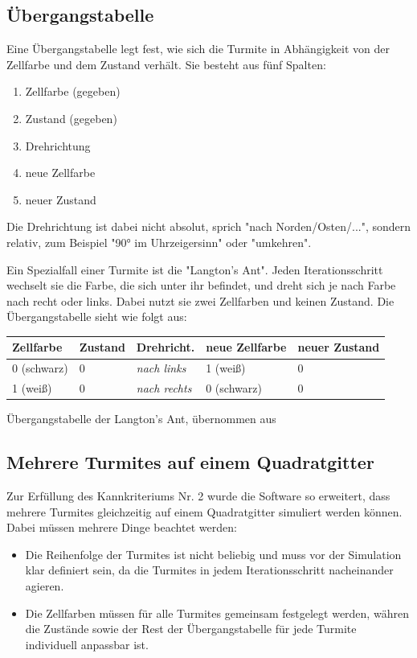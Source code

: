 \subsection{Übergangstabelle}
Eine Übergangstabelle legt fest, wie sich die Turmite in Abhängigkeit von der Zellfarbe und dem Zustand verhält. Sie besteht aus fünf Spalten:
\begin{enumerate}
    \item Zellfarbe (gegeben)
    \item Zustand (gegeben)
    \item Drehrichtung
    \item neue Zellfarbe
    \item neuer Zustand
\end{enumerate}

Die Drehrichtung ist dabei nicht absolut, sprich "nach Norden/Osten/...", sondern relativ, zum Beispiel "90° im Uhrzeigersinn" oder "umkehren".

Ein Spezialfall einer Turmite ist die "Langton's Ant". Jeden Iterationsschritt wechselt sie die Farbe, die sich unter ihr befindet, und dreht sich je nach Farbe nach recht oder links. Dabei nutzt sie zwei Zellfarben und keinen Zustand. Die Übergangstabelle sieht wie folgt aus:

\begin{tabular}{|l|l||l|l|l|}
    \textbf{Zellfarbe} & \textbf{Zustand} & \textbf{Drehricht.} & \textbf{neue Zellfarbe} & \textbf{neuer Zustand} \\
    \hline
    0 (schwarz) & 0 & \textit{nach links} & 1 (weiß) & 0 \\
    1 (weiß) & 0 & \textit{nach rechts} & 0 (schwarz) & 0 \\
\end{tabular}
Übergangstabelle der Langton's Ant, übernommen aus \cite{pflichtenheft}

\subsection{Mehrere Turmites auf einem Quadratgitter}
Zur Erfüllung des Kannkriteriums Nr. 2 \cite{pflichtenheft} wurde die Software so erweitert, dass mehrere Turmites gleichzeitig auf einem Quadratgitter simuliert werden können. Dabei müssen mehrere Dinge beachtet werden:

\begin{itemize}
    \item Die Reihenfolge der Turmites ist nicht beliebig und muss vor der Simulation klar definiert sein, da die Turmites in jedem Iterationsschritt nacheinander agieren.
    \item Die Zellfarben müssen für alle Turmites gemeinsam festgelegt werden, währen die Zustände sowie der Rest der Übergangstabelle für jede Turmite individuell anpassbar ist.
\end{itemize}


